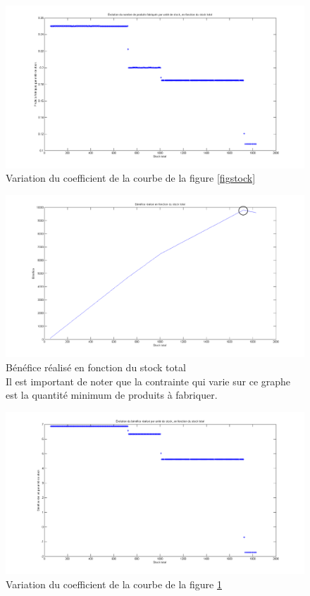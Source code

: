 \documentclass[paper=a4, fontsize=11pt]{report}
\numberwithin{equation}{section}		%
\numberwithin{figure}{section}			%
\numberwithin{table}{section}				%
\begin{document}
\begin{figure}[H]
\centering
\includegraphics[width=16cm]{figures/nbProduitsFctStockTotal_Coeff.png}
\caption{Variation du coefficient de la courbe de la figure \ref{figstock}}
\end{figure}

\begin{figure}[H]
\centering
\includegraphics[width=16cm]{figures/BenefFctStockTotal.png}
\caption{Bénéfice réalisé en fonction du stock total \label{figben} \\
Il est important de noter que la contrainte qui varie sur ce graphe est la quantité minimum de produits à fabriquer.}
\end{figure}

\begin{figure}[H]
\centering
\includegraphics[width=16cm]{figures/BenefFctStockTotal_Coeff.png}
\caption{Variation du coefficient de la courbe de la figure \ref{figben}}
\end{figure}
\end{document}
